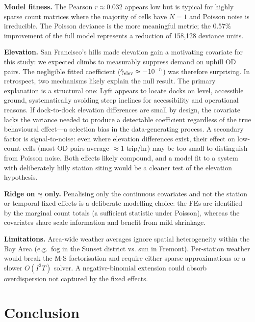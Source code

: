 \documentclass[conference,10pt]{IEEEtran}
\begin{document}
\textbf{Model fitness.}
The Pearson $r\approx 0.032$ appears low but is typical for
highly sparse count matrices where the majority of cells have $N=1$
and Poisson noise is irreducible.  The Poisson deviance is the
more meaningful metric; the 0.57\% improvement of the full model
represents a reduction of 158{,}128 deviance units.

\textbf{Elevation.}
San Francisco's hills made elevation gain a motivating covariate for
this study: we expected climbs to measurably suppress demand on uphill
OD pairs.  The negligible fitted coefficient
($\hat\gamma_{\rm elev}\approx -10^{-5}$) was therefore surprising.
In retrospect, two mechanisms likely explain the null result.
The primary explanation is a structural one: Lyft appears to locate
docks on level, accessible ground, systematically avoiding steep
inclines for accessibility and operational reasons.  If dock-to-dock
elevation differences are small by design, the covariate lacks the
variance needed to produce a detectable coefficient regardless of the
true behavioural effect---a selection bias in the data-generating
process.  A secondary factor is signal-to-noise: even where elevation
differences exist, their effect on low-count cells (most OD pairs
average $\approx$1 trip/hr) may be too small to distinguish from
Poisson noise.  Both effects likely compound, and a model fit to a
system with deliberately hilly station siting would be a cleaner test
of the elevation hypothesis.

\textbf{Ridge on $\boldsymbol\gamma$ only.}
Penalising only the continuous covariates and not the station or
temporal fixed effects is a deliberate modelling choice: the FEs are
identified by the marginal count totals (a sufficient statistic under
Poisson), whereas the covariates share scale information and benefit
from mild shrinkage.

\textbf{Limitations.}
Area-wide weather averages ignore spatial heterogeneity within the
Bay Area (e.g.\ fog in the Sunset district vs. sun in Fremont).
Per-station weather would break the M$\cdot$S factorisation and require
either sparse approximations or a slower $O(I^2 T)$ solver.
A negative-binomial extension could absorb overdispersion not captured
by the fixed effects.

\section{Conclusion}
\end{document}
